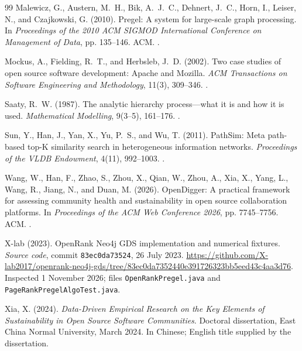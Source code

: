 \clearpage
\begingroup
\renewcommand{\bibsection}{\section*{References\enspace{\normalfont\sffamily\fontsize{11}{14}\selectfont continued}}}
\begin{thebibliography}{99}
Malewicz, G., Austern, M.~H., Bik, A.~J.~C., Dehnert, J.~C., Horn, I., Leiser, N., and Czajkowski, G. (2010).
Pregel: A system for large-scale graph processing.
In \emph{Proceedings of the 2010 ACM SIGMOD International Conference on Management of Data}, pp. 135--146. ACM.
.

Mockus, A., Fielding, R.~T., and Herbsleb, J.~D. (2002).
Two case studies of open source software development: Apache and Mozilla.
\emph{ACM Transactions on Software Engineering and Methodology}, 11(3), 309--346.
.

Saaty, R.~W. (1987).
The analytic hierarchy process---what it is and how it is used.
\emph{Mathematical Modelling}, 9(3--5), 161--176.
.

Sun, Y., Han, J., Yan, X., Yu, P.~S., and Wu, T. (2011).
PathSim: Meta path-based top-K similarity search in heterogeneous information networks.
\emph{Proceedings of the VLDB Endowment}, 4(11), 992--1003.
.

Wang, W., Han, F., Zhao, S., Zhou, X., Qian, W., Zhou, A., Xia, X., Yang, L., Wang, R., Jiang, N., and Duan, M. (2026).
OpenDigger: A practical framework for assessing community health and sustainability in open source collaboration platforms.
In \emph{Proceedings of the ACM Web Conference 2026}, pp. 7745--7756. ACM.
.

X-lab (2023).
OpenRank Neo4j GDS implementation and numerical fixtures.
\emph{Source code}, commit \texttt{83ec0da73524}, 26 July 2023.
\url{https://github.com/X-lab2017/openrank-neo4j-gds/tree/83ec0da7352440e391726323bb5eed43c4aa3d76}.
Inspected 1 November 2026; files \texttt{OpenRankPregel.java} and \texttt{PageRankPregelAlgoTest.java}.

Xia, X. (2024).
\emph{Data-Driven Empirical Research on the Key Elements of Sustainability in Open Source Software Communities}.
Doctoral dissertation, East China Normal University, March 2024. In Chinese; English title supplied by the dissertation.


\end{thebibliography}
